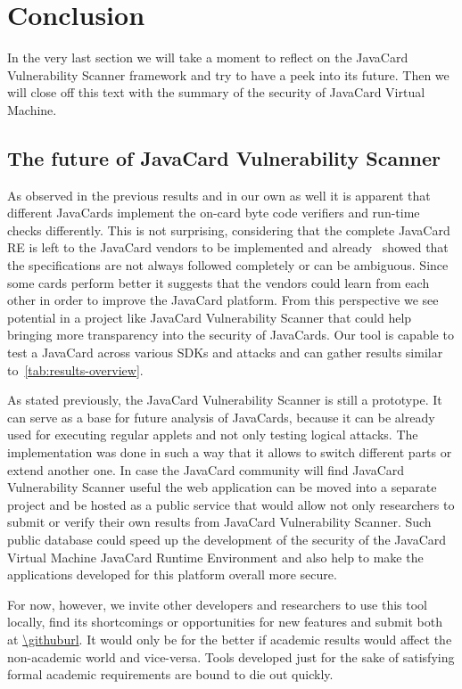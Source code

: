 \chapter{Conclusion}
        In the very last section we will take a moment to reflect on the JavaCard Vulnerability Scanner framework and try to have a peek into its future. Then we will close off this text with the summary of the security of JavaCard Virtual Machine.

        \section{The future of JavaCard Vulnerability Scanner}

        As observed in the previous results and in our own as well it is apparent that different JavaCards implement the on-card byte code verifiers and run-time checks differently. This is not surprising, considering that the complete JavaCard RE is left to the JavaCard vendors to be implemented and already~\cite{Mostowski07testingthe} showed that the specifications are not always followed completely or can be ambiguous. Since some cards perform better it suggests that the vendors could learn from each other in order to improve the JavaCard platform. From this perspective we see potential in a project like JavaCard Vulnerability Scanner that could help bringing more transparency into the security of JavaCards. Our tool is capable to test a JavaCard across various SDKs and attacks and can gather results similar to~\ref{tab:results-overview}.

        As stated previously, the JavaCard Vulnerability Scanner is still a prototype. It can serve as a base for future analysis of JavaCards, because it can be already used for executing regular applets and not only testing logical attacks. The implementation was done in such a way that it allows to switch different parts or extend another one. In case the JavaCard community will find JavaCard Vulnerability Scanner useful the web application can be moved into a separate project and be hosted as a public service that would allow not only researchers to submit or verify their own results from JavaCard Vulnerability Scanner. Such public database could speed up the development of the security of the JavaCard Virtual Machine JavaCard Runtime Environment and also help to make the applications developed for this platform overall more secure.

        For now, however, we invite other developers and researchers to use this tool locally, find its shortcomings or opportunities for new features and submit both at \url{\githuburl}. It would only be for the better if academic results would affect the non-academic world and vice-versa. Tools developed just for the sake of satisfying formal academic requirements are bound to die out quickly.

